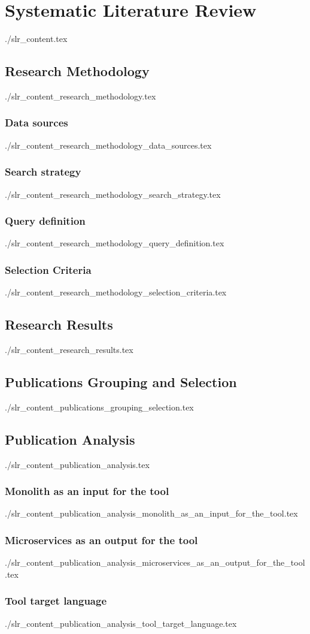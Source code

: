 \section{Systematic Literature Review}
  {./slr_content.tex}

\subsection{Research Methodology} \label{sub:research-methodology}
  {./slr_content_research_methodology.tex}
  \subsubsection{Data sources}
  {./slr_content_research_methodology_data_sources.tex}
  \subsubsection{Search strategy}
  {./slr_content_research_methodology_search_strategy.tex}
  \subsubsection{Query definition}
  {./slr_content_research_methodology_query_definition.tex}
  \subsubsection{Selection Criteria} \label{sub:selection-criteria}
  {./slr_content_research_methodology_selection_criteria.tex}

\subsection{Research Results}
  {./slr_content_research_results.tex}

\subsection{Publications Grouping and Selection}
  {./slr_content_publications_grouping_selection.tex}

\subsection{Publication Analysis} \label{sub:publication-analysis}
  {./slr_content_publication_analysis.tex}
  \subsubsection{Monolith as an input for the tool}
  {./slr_content_publication_analysis_monolith_as_an_input_for_the_tool.tex}
  \subsubsection{Microservices as an output for the tool}
  {./slr_content_publication_analysis_microservices_as_an_output_for_the_tool.tex}
  \subsubsection{Tool target language}
  {./slr_content_publication_analysis_tool_target_language.tex}
